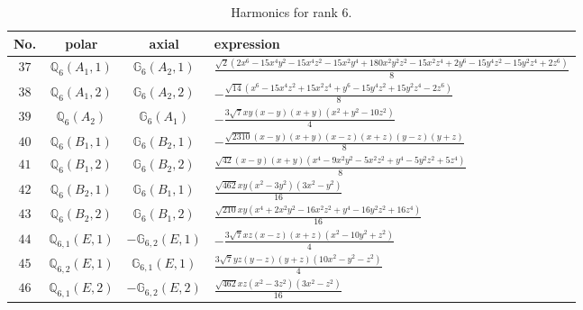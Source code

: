 \documentclass[fleqn,8pt,landscape]{jsarticle}
\begin{document}
\begin{table}[ht!]
\begin{center}
\caption{Harmonics for rank 6.}
\renewcommand{\arraystretch}{1.3}
\begin{tabular}{cccl} \hline \hline
No. & polar & axial & expression \\ \hline
$ 37 $ & $ \mathbb{Q}_{6}(A_{1},1) $ & $ \mathbb{G}_{6}(A_{2},1) $ & $ \frac{\sqrt{2} \left(2 x^{6} - 15 x^{4} y^{2} - 15 x^{4} z^{2} - 15 x^{2} y^{4} + 180 x^{2} y^{2} z^{2} - 15 x^{2} z^{4} + 2 y^{6} - 15 y^{4} z^{2} - 15 y^{2} z^{4} + 2 z^{6}\right)}{8} $ \\
$ 38 $ & $ \mathbb{Q}_{6}(A_{1},2) $ & $ \mathbb{G}_{6}(A_{2},2) $ & $ - \frac{\sqrt{14} \left(x^{6} - 15 x^{4} z^{2} + 15 x^{2} z^{4} + y^{6} - 15 y^{4} z^{2} + 15 y^{2} z^{4} - 2 z^{6}\right)}{8} $ \\
$ 39 $ & $ \mathbb{Q}_{6}(A_{2}) $ & $ \mathbb{G}_{6}(A_{1}) $ & $ - \frac{3 \sqrt{7} x y \left(x - y\right) \left(x + y\right) \left(x^{2} + y^{2} - 10 z^{2}\right)}{4} $ \\
$ 40 $ & $ \mathbb{Q}_{6}(B_{1},1) $ & $ \mathbb{G}_{6}(B_{2},1) $ & $ - \frac{\sqrt{2310} \left(x - y\right) \left(x + y\right) \left(x - z\right) \left(x + z\right) \left(y - z\right) \left(y + z\right)}{8} $ \\
$ 41 $ & $ \mathbb{Q}_{6}(B_{1},2) $ & $ \mathbb{G}_{6}(B_{2},2) $ & $ \frac{\sqrt{42} \left(x - y\right) \left(x + y\right) \left(x^{4} - 9 x^{2} y^{2} - 5 x^{2} z^{2} + y^{4} - 5 y^{2} z^{2} + 5 z^{4}\right)}{8} $ \\
$ 42 $ & $ \mathbb{Q}_{6}(B_{2},1) $ & $ \mathbb{G}_{6}(B_{1},1) $ & $ \frac{\sqrt{462} x y \left(x^{2} - 3 y^{2}\right) \left(3 x^{2} - y^{2}\right)}{16} $ \\
$ 43 $ & $ \mathbb{Q}_{6}(B_{2},2) $ & $ \mathbb{G}_{6}(B_{1},2) $ & $ \frac{\sqrt{210} x y \left(x^{4} + 2 x^{2} y^{2} - 16 x^{2} z^{2} + y^{4} - 16 y^{2} z^{2} + 16 z^{4}\right)}{16} $ \\
$ 44 $ & $ \mathbb{Q}_{6,1}(E,1) $ & $ -\mathbb{G}_{6,2}(E,1) $ & $ - \frac{3 \sqrt{7} x z \left(x - z\right) \left(x + z\right) \left(x^{2} - 10 y^{2} + z^{2}\right)}{4} $ \\
$ 45 $ & $ \mathbb{Q}_{6,2}(E,1) $ & $ \mathbb{G}_{6,1}(E,1) $ & $ \frac{3 \sqrt{7} y z \left(y - z\right) \left(y + z\right) \left(10 x^{2} - y^{2} - z^{2}\right)}{4} $ \\
$ 46 $ & $ \mathbb{Q}_{6,1}(E,2) $ & $ -\mathbb{G}_{6,2}(E,2) $ & $ \frac{\sqrt{462} x z \left(x^{2} - 3 z^{2}\right) \left(3 x^{2} - z^{2}\right)}{16} $ \\

\end{tabular}
\end{center}
\end{table}
\end{document}
